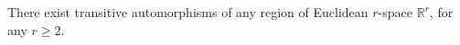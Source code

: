 There exist transitive automorphisms of any region of Euclidean $r$-space $\mathbb{R}^r$, for any $r \geq 2$.
